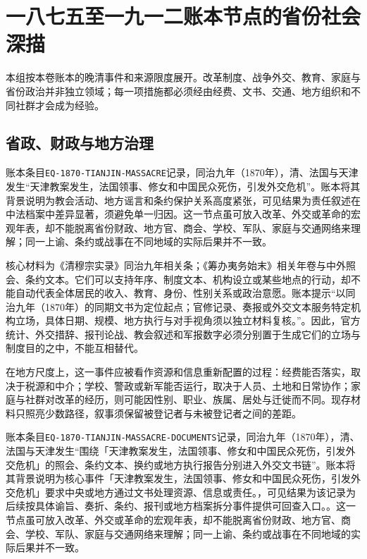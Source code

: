 \section{一八七五至一九一二账本节点的省份社会深描}

\label{sec:late-qing-ledger-depth-1875-1912}

本组按本卷账本的晚清事件和来源限度展开。改革制度、战争外交、教育、家庭与省份政治并非独立领域；每一项措施都必须经由经费、文书、交通、地方组织和不同社群才会成为经验。

\subsection{省政、财政与地方治理}

账本条目\texttt{EQ-1870-TIANJIN-MASSACRE}记录，同治九年（1870年），清、法国与天津发生“天津教案发生，法国领事、修女和中国民众死伤，引发外交危机”。账本将其背景说明为教会活动、地方谣言和条约保护关系高度紧张，可见结果为责任叙述在中法档案中差异显著，须避免单一归因。这一节点虽可放入改革、外交或革命的宏观年表，却不能脱离省份财政、地方官、商会、学校、军队、家庭与交通网络来理解；同一上谕、条约或战事在不同地域的实际后果并不一致。

核心材料为《清穆宗实录》同治九年相关条；《筹办夷务始末》相关年卷与中外照会、条约文本。它们可以支持年序、制度文本、机构设立或某些地点的行动，却不能自动代表全体居民的收入、教育、身份、性别关系或政治意愿。账本提示“以同治九年（1870年）的同期文书为定位起点；官修记录、奏报或外交文本服务特定机构立场，具体日期、规模、地方执行与对手视角须以独立材料复核。”。因此，官方统计、外交措辞、报刊论战、教会叙述和军报数字必须分别置于生成它们的立场与制度目的之中，不能互相替代。

在地方尺度上，这一事件应被看作资源和信息重新配置的过程：经费能否落实，取决于税源和中介；学校、警政或新军能否运行，取决于人员、土地和日常协作；家庭与社群对改革的经历，则可能因性别、职业、族属、居处与迁徙而不同。现存材料只照亮少数路径，叙事须保留被登记者与未被登记者之间的差距。

账本条目\texttt{EQ-1870-TIANJIN-MASSACRE-DOCUMENTS}记录，同治九年（1870年），清、法国与天津发生“围绕「天津教案发生，法国领事、修女和中国民众死伤，引发外交危机」的照会、条约文本、换约或地方执行报告分别进入外交文书链”。账本将其背景说明为核心事件「天津教案发生，法国领事、修女和中国民众死伤，引发外交危机」要求中央或地方通过文书处理资源、信息或责任。，可见结果为该记录为后续按具体谕旨、奏折、条约、报刊或地方档案拆分事件提供可回查入口。。这一节点虽可放入改革、外交或革命的宏观年表，却不能脱离省份财政、地方官、商会、学校、军队、家庭与交通网络来理解；同一上谕、条约或战事在不同地域的实际后果并不一致。

